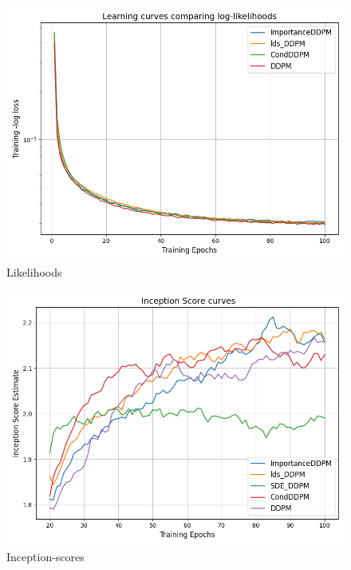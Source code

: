\begin{figure}[H]
  \centering
  \includegraphics[width=0.9\linewidth]{./figures/loss.png}
  \caption{Likelihoods}
  \label{fig:ddpm:loss}
\end{figure}

\begin{figure}[H]
  \centering
  \includegraphics[width=0.9\linewidth]{./figures/Inception.png}
  \caption{Inception-scores}
  \label{fig:ddpm:inception}
\end{figure}

